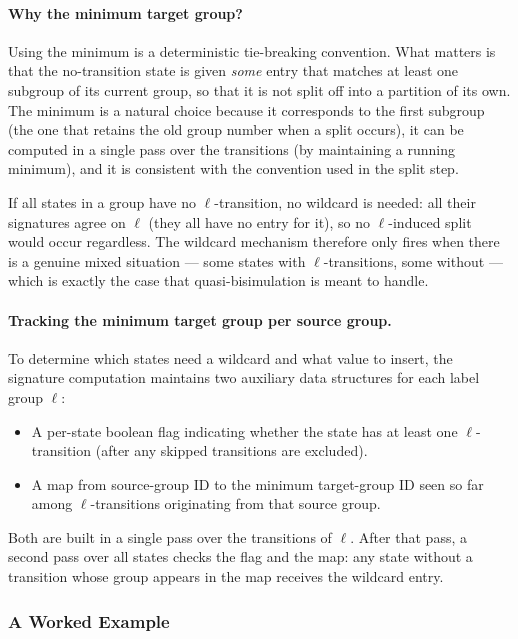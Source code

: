 \documentclass[11pt,a4paper]{article}
\begin{document}
\paragraph{Why the minimum target group?}
Using the minimum is a deterministic tie-breaking convention.  What matters is
that the no-transition state is given \emph{some} entry that matches at least
one subgroup of its current group, so that it is not split off into a partition
of its own.  The minimum is a natural choice because it corresponds to the
first subgroup (the one that retains the old group number when a split occurs),
it can be computed in a single pass over the transitions (by maintaining a
running minimum), and it is consistent with the convention used in the split
step.

If all states in a group have no $\ell$-transition, no wildcard is needed:
all their signatures agree on $\ell$ (they all have no entry for it), so no
$\ell$-induced split would occur regardless.  The wildcard mechanism therefore
only fires when there is a genuine mixed situation --- some states with
$\ell$-transitions, some without --- which is exactly the case that
quasi-bisimulation is meant to handle.

\paragraph{Tracking the minimum target group per source group.}
To determine which states need a wildcard and what value to insert, the
signature computation maintains two auxiliary data structures for each label
group $\ell$:
\begin{itemize}
  \item A per-state boolean flag indicating whether the state has at least
    one $\ell$-transition (after any skipped transitions are excluded).
  \item A map from source-group ID to the minimum target-group ID seen so far
    among $\ell$-transitions originating from that source group.
\end{itemize}
Both are built in a single pass over the transitions of $\ell$.  After that
pass, a second pass over all states checks the flag and the map: any state
without a transition whose group appears in the map receives the wildcard
entry.

\subsubsection{A Worked Example}
\end{document}
